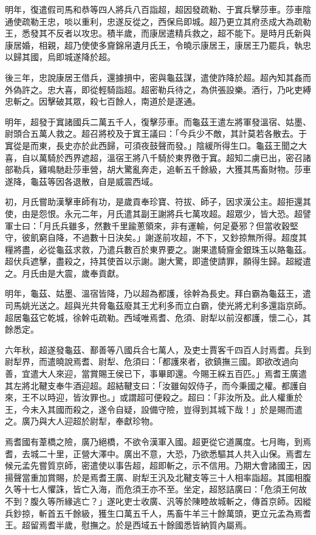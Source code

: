 \begin{pinyinscope}
明年，復遣假司馬和恭等四人將兵八百詣超，超因發疏勒、于窴兵擊莎車。莎車陰通使疏勒王忠，啖以重利，忠遂反從之，西保烏即城。超乃更立其府丞成大為疏勒王，悉發其不反者以攻忠。積半歲，而康居遣精兵救之，超不能下。是時月氏新與康居婚，相親，超乃使使多齎錦帛遺月氏王，令曉示康居王，康居王乃罷兵，執忠以歸其國，烏即城遂降於超。

後三年，忠說康居王借兵，還據損中，密與龜茲謀，遣使詐降於超。超內知其姦而外偽許之。忠大喜，即從輕騎詣超。超密勒兵待之，為供張設樂。酒行，乃叱吏縛忠斬之。因擊破其眾，殺七百餘人，南道於是遂通。

明年，超發于窴諸國兵二萬五千人，復擊莎車。而龜茲王遣左將軍發溫宿、姑墨、尉頭合五萬人救之。超召將校及于窴王議曰：「今兵少不敵，其計莫若各散去。于窴從是而東，長史亦於此西歸，可須夜鼓聲而發。」陰緩所得生口。龜茲王聞之大喜，自以萬騎於西界遮超，溫宿王將八千騎於東界徼于窴。超知二虜已出，密召諸部勒兵，雞鳴馳赴莎車營，胡大驚亂奔走，追斬五千餘級，大獲其馬畜財物。莎車遂降，龜茲等因各退散，自是威震西域。

初，月氏嘗助漢擊車師有功，是歲貢奉珍寶、符拔、師子，因求漢公主。超拒還其使，由是怨恨。永元二年，月氏遣其副王謝將兵七萬攻超。超眾少，皆大恐。超譬軍士曰：「月氏兵雖多，然數千里踰蔥領來，非有運輸，何足憂邪？但當收穀堅守，彼飢窮自降，不過數十日決矣。」謝遂前攻超，不下，又鈔掠無所得。超度其糧將盡，必從龜茲求救，乃遣兵數百於東界要之。謝果遣騎齎金銀珠玉以賂龜茲。超伏兵遮擊，盡殺之，持其使首以示謝。謝大驚，即遣使請罪，願得生歸。超縱遣之。月氏由是大震，歲奉貢獻。

明年，龜茲、姑墨、溫宿皆降，乃以超為都護，徐幹為長史。拜白霸為龜茲王，遣司馬姚光送之。超與光共脅龜茲廢其王尤利多而立白霸，使光將尤利多還詣京師。超居龜茲它乾城，徐幹屯疏勒。西域唯焉耆、危須、尉犁以前沒都護，懷二心，其餘悉定。

六年秋，超遂發龜茲、鄯善等八國兵合七萬人，及吏士賈客千四百人討焉耆。兵到尉犁界，而遣曉說焉耆、尉犁、危須曰：「都護來者，欲鎮撫三國。即欲改過向善，宜遣大人來迎，當賞賜王侯已下，事畢即還。今賜王綵五百匹。」焉耆王廣遣其左將北鞬支奉牛酒迎超。超結鞬支曰：「汝雖匈奴侍子，而今秉國之權。都護自來，王不以時迎，皆汝罪也。」或謂超可便殺之。超曰：「非汝所及。此人權重於王，今未入其國而殺之，遂令自疑，設備守險，豈得到其城下哉！」於是賜而遣之。廣乃與大人迎超於尉犁，奉獻珍物。

焉耆國有葦橋之險，廣乃絕橋，不欲令漢軍入國。超更從它道厲度。七月晦，到焉耆，去城二十里，正營大澤中。廣出不意，大恐，乃欲悉驅其人共入山保。焉耆左候元孟先嘗質京師，密遣使以事告超，超即斬之，示不信用。乃期大會諸國王，因揚聲當重加賞賜，於是焉耆王廣、尉犁王汎及北鞬支等三十人相率詣超。其國相腹久等十七人懼誅，皆亡入海，而危須王亦不至。坐定，超怒詰廣曰：「危須王何故不到？腹久等所緣逃亡？」遂叱吏士收廣、汎等於陳睦故城斬之，傳首京師。因縱兵鈔掠，斬首五千餘級，獲生口萬五千人，馬畜牛羊三十餘萬頭，更立元孟為焉耆王。超留焉耆半歲，慰撫之。於是西域五十餘國悉皆納質內屬焉。


\end{pinyinscope}
